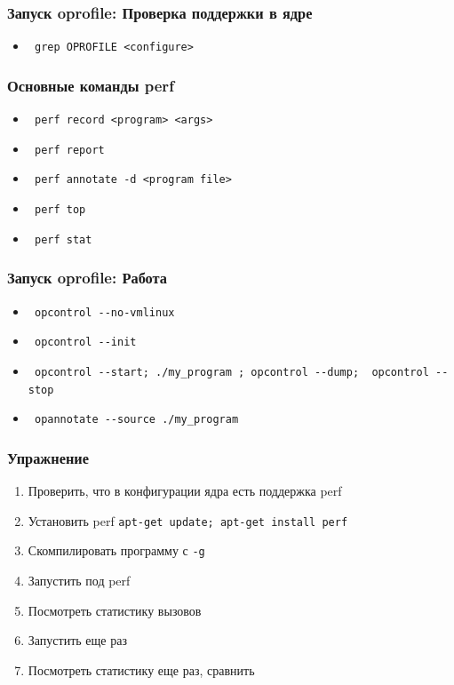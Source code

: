 \begin{frame}[fragile]
 \frametitle{Запуск oprofile: Проверка поддержки в ядре}
 \begin{itemize}
   \item \verb+ grep OPROFILE <configure>+
 \end{itemize}
\end{frame} 

\begin{frame}[fragile]
 \frametitle{Основные команды perf}
 \begin{itemize}
   \item \verb+ perf record <program> <args>+
   \item \verb+ perf report+
   \item \verb+ perf annotate -d <program file>+
   \item \verb+ perf top+
   \item \verb+ perf stat+
 \end{itemize}
\end{frame}

\begin{frame}[fragile]
 \frametitle{Запуск oprofile: Работа}
 \begin{itemize}
  \item \verb+ opcontrol --no-vmlinux+ 
  \item \verb+ opcontrol --init+
  \item \verb+ opcontrol --start; ./my_program ; opcontrol --dump;  opcontrol --stop+
  \item \verb+ opannotate --source ./my_program +
 \end{itemize}
\end{frame}

\begin{frame}[fragile]
 \frametitle{Упражнение}
 \begin{enumerate}
  \item Проверить, что в конфигурации ядра есть поддержка perf
  \item Установить perf \verb+apt-get update; apt-get install perf +
  \item Скомпилировать программу с \texttt{-g}
  \item Запустить под perf
  \item Посмотреть статистику вызовов
  \item Запустить еще раз
  \item Посмотреть статистику еще раз, сравнить
 \end{enumerate}
\end{frame}
